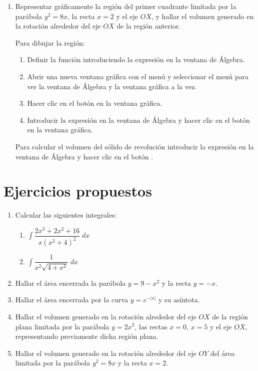 \begin{enumerate}[leftmargin=*]
\item  Representar gráficamente la región del primer cuadrante limitada por la parábola $y^{2}=8x$, la recta $x=2$ y el eje $OX$, y hallar el volumen generado en la rotación alrededor del eje $OX$ de la región anterior.
\begin{indicacion}
Para dibujar la región:
\begin{enumerate}
\item Definir la función introduciendo la expresión   en la ventana de Álgebra.
\item Abrir una nueva ventana gráfica con el menú  y seleccionar el menú  para ver la ventana de Álgebra y la ventana gráfica a la vez.
\item Hacer clic en el botón  en la ventana gráfica.
\item Introducir la expresión  en la ventana de Álgebra y hacer clic en el botón  en la ventana gráfica.
\end{enumerate}
Para calcular el volumen del sólido de revolución introducir la expresión  en la ventana de Álgebra y hacer clic en el botón .
\end{indicacion}

\end{enumerate}


\section{Ejercicios propuestos}
\begin{enumerate}[leftmargin=*]
\item Calcular las siguientes integrales:
\begin{enumerate}
\item $ \int{\dfrac{2x^{3}+2x^{2}+16}{x(x^{2}+4)^{2}}\;dx}$
\item $ \int{\dfrac{1}{x^{2}\sqrt{4+x^{2}}}\;dx}$
\end{enumerate}

\item Hallar el área encerrada la parábola $y=9-x^{2}$ y la recta $y=-x$.

\item Hallar el área encerrada por la curva $y=e^{-|x|}$ y su asíntota.

\item Hallar el volumen generado en la rotación alrededor del eje $OX$ de la región plana limitada por la parábola $y=2x^{2}$, las rectas
$x=0$, $x=5$ y el eje $OX$, representando previamente dicha región plana.

\item Hallar el volumen generado en la rotación alrededor del eje $OY$ del área limitada por la parábola $y^{2}=8x$ y la recta $x=2$.

\end{enumerate}

